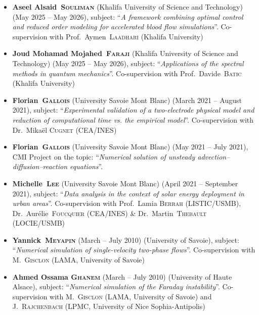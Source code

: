 \documentclass[final, a4paper, oneside, 12pt]{article}
\numberwithin{equation}{section}
\begin{document}
\begin{itemize}

  \item \textbf{Aseel Alsaid~\textsc{Souliman}} (Khalifa University of Science and Technology) (May 2025 -- May 2026), subject: ``\textit{A framework combining optimal control and reduced order modeling for accelerated blood flow simulations}''. Co-supervision with Prof.~Aymen~\textsc{Laadhari} (Khalifa University)

  \item \textbf{Joud Mohamad Mojahed~\textsc{Faraji}} (Khalifa University of Science and Technology) (May 2025 -- May 2026), subject: ``\textit{Applications of the spectral methods in quantum mechanics}''. Co-supervision with Prof.~Davide~\textsc{Batic} (Khalifa University)

  \item \textbf{Florian~\textsc{Gallois}} (University Savoie Mont Blanc) (March 2021 -- August 2021), subject: ``\textit{Experimental validation of a two-electrode physical model and reduction of computational time vs. the empirical model}''. Co-supervision with Dr.~Mika\"el \textsc{Cugnet} (CEA/INES)
  
  \item \textbf{Florian~\textsc{Gallois}} (University Savoie Mont Blanc) (May 2021 -- July 2021), CMI Project on the topic: ``\textit{Numerical solution of unsteady advection--diffusion--reaction equations}''.
  
  \item \textbf{Michelle~\textsc{Lee}} (University Savoie Mont Blanc) (April 2021 -- September 2021), subject: ``\textit{Data analysis in the context of solar energy deployment in urban areas}''. Co-supervision with Prof.~Lamia \textsc{Berrah} (LISTIC/USMB), Dr.~Aur\'elie~\textsc{Foucquier} (CEA/INES) \& Dr.~Martin~\textsc{Thebault} (LOCIE/USMB)

  \item \textbf{Yannick~\textsc{Meyapin}} (March -- July 2010) (University of Savoie), subject: ``\textit{Numerical simulation of single-velocity two-phase flows}''. Co-supervision with M.~\textsc{Gisclon} (LAMA, University of Savoie)
  
  \item \textbf{Ahmed Ossama \textsc{Ghanem}} (March -- July 2010) (University of Haute Alsace), subject: ``\textit{Numerical simulation of the Faraday instability}''. Co-supervision with M.~\textsc{Gisclon} (LAMA, University of Savoie) and J.~\textsc{Rajchenbach} (LPMC, University of Nice Sophia-Antipolis)
  

\end{itemize}
\end{document}
